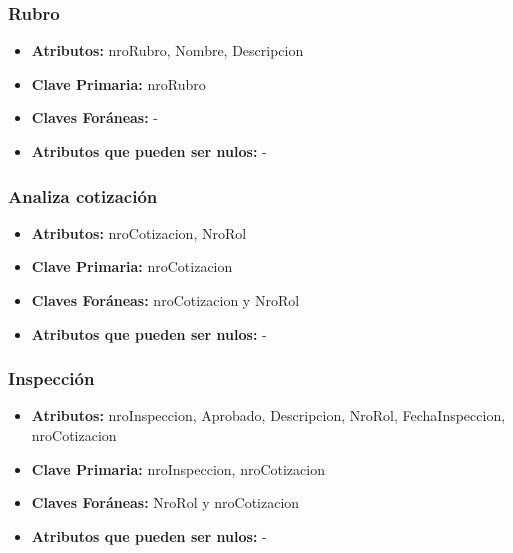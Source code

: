 \documentclass[a4paper,11pt]{article}
\begin{document}
\subsubsection{Rubro}

\begin{itemize}

	\item \textbf{Atributos:} nroRubro, Nombre, Descripcion
	
	\item \textbf{Clave Primaria:} nroRubro
	
	\item \textbf{Claves Foráneas:} -

	\item \textbf{Atributos que pueden ser nulos:} -
	
\end{itemize}

\subsubsection{Analiza cotización}

\begin{itemize}

	\item \textbf{Atributos:} nroCotizacion, NroRol
	
	\item \textbf{Clave Primaria:} nroCotizacion
	
	\item \textbf{Claves Foráneas:} nroCotizacion y NroRol

	\item \textbf{Atributos que pueden ser nulos:} -
	
\end{itemize}

\subsubsection{Inspección}

\begin{itemize}

	\item \textbf{Atributos:} nroInspeccion, Aprobado, Descripcion, NroRol, FechaInspeccion, nroCotizacion
	
	\item \textbf{Clave Primaria:} nroInspeccion, nroCotizacion
	
	\item \textbf{Claves Foráneas:} NroRol y nroCotizacion

	\item \textbf{Atributos que pueden ser nulos:} -
	
\end{itemize}
\end{document}
